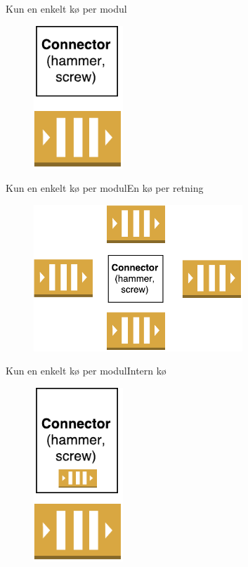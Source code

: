\begin{frame}{Kun en enkelt kø per modul}{}
  \begin{figure}
    \centering
    \includegraphics[width=0.3\textwidth]{figures/1queue.pdf}
  \end{figure}
\end{frame}

\begin{frame}{Kun en enkelt kø per modul}{En kø per retning}
  \begin{figure}
    \centering
    \includegraphics[width=0.7\textwidth]{figures/4Queues.pdf}
  \end{figure}
\end{frame}

\begin{frame}{Kun en enkelt kø per modul}{Intern kø}
  \begin{figure}
    \centering
    \includegraphics[width=0.3\textwidth]{figures/internalQueue.pdf}
  \end{figure}
\end{frame}

